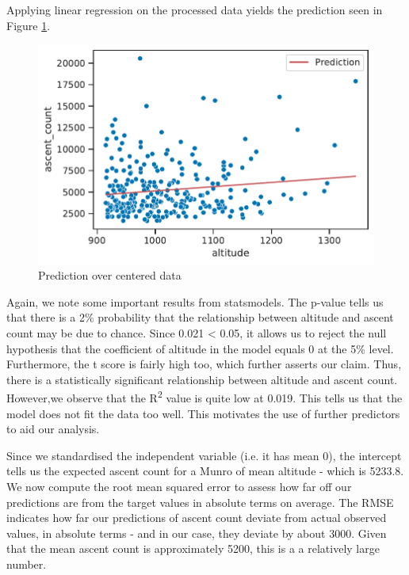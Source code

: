 \documentclass[11pt,a4paper]{article}
\begin{document}
\medskip 

Applying linear regression on the processed data yields the prediction seen in Figure \ref{fds-project-template:fig:q1_prediction}. 

\begin{figure} [h!]
  \centering
  \includegraphics[scale = 0.7]{report/q1_prediction.pdf}
  \caption{Prediction over centered data}
  \label{fds-project-template:fig:q1_prediction}
\end{figure}

\medskip

Again, we note some important results from statsmodels. The p-value tells us that there is a 2\% probability that the relationship between altitude and ascent count may be due to chance. Since 0.021 < 0.05, it allows us to reject the null hypothesis that the coefficient of altitude in the model equals 0 at the 5\% level. Furthermore, the t score is fairly high too, which further asserts our claim. Thus, there is a statistically significant relationship between altitude and ascent count. However,we observe that the R\textsuperscript{2} value is quite low at 0.019. This tells us that the model does not fit the data too well. This motivates the use of further predictors to aid our analysis.

\medskip 

Since we standardised the independent variable (i.e. it has mean 0), the intercept tells us the expected ascent count for a Munro of mean altitude - which is 5233.8. We now compute the root mean squared error to assess how far off our predictions are from the target values in absolute terms on average. The RMSE indicates how far our predictions of ascent count deviate from actual observed values, in absolute terms - and in our case, they deviate by about 3000. Given that the mean ascent count is approximately 5200, this is a a relatively large number.
\end{document}
